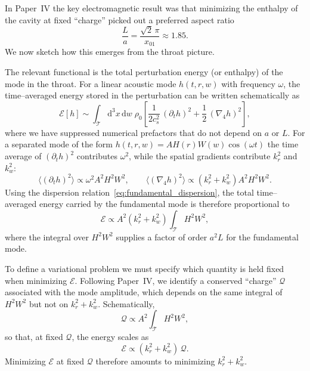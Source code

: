 \documentclass[12pt]{article}
\begin{document}
In Paper~IV the key electromagnetic result was that minimizing the enthalpy
of the cavity at fixed ``charge'' picked out a preferred aspect ratio
\begin{equation}
  \frac{L}{a} = \frac{\sqrt{2}\,\pi}{x_{01}} \approx 1.85.
  \label{eq:aspect_ratio_result}
\end{equation}
We now sketch how this emerges from the throat picture.

The relevant functional is the total perturbation energy (or enthalpy) of
the mode in the throat.  For a linear acoustic mode $h(t,r,w)$ with
frequency $\omega$, the time--averaged energy stored in the perturbation can
be written schematically as
\begin{equation}
  \mathcal{E}[h]
  \sim \int_{\mathcal{T}}\!\mathrm{d}^3x\,\mathrm{d}w\;
       \rho_0
       \left[
         \frac{1}{2c_s^2}\,(\partial_t h)^2
         + \frac{1}{2}\,(\nabla_4 h)^2
       \right],
  \label{eq:enthalpy_functional}
\end{equation}
where we have suppressed numerical prefactors that do not depend on $a$ or
$L$.  For a separated mode of the form
$h(t,r,w) = A H(r)W(w)\cos(\omega t)$ the time average of $(\partial_t h)^2$
contributes $\omega^2$, while the spatial gradients contribute $k_r^2$ and
$k_w^2$:
\begin{equation}
  \langle (\partial_t h)^2 \rangle
  \propto \omega^2 A^2 H^2 W^2,
  \qquad
  \langle (\nabla_4 h)^2 \rangle
  \propto (k_r^2 + k_w^2) A^2 H^2 W^2.
\end{equation}
Using the dispersion relation~\eqref{eq:fundamental_dispersion}, the total
time--averaged energy carried by the fundamental mode is therefore
proportional to
\begin{equation}
  \mathcal{E}
  \propto A^2 (k_r^2 + k_w^2) \int_{\mathcal{T}} H^2 W^2,
  \label{eq:energy_kw}
\end{equation}
where the integral over $H^2 W^2$ supplies a factor of order $a^2 L$ for the
fundamental mode.

To define a variational problem we must specify which quantity is held fixed
when minimizing $\mathcal{E}$.  Following Paper~IV, we identify a conserved
``charge'' $\mathcal{Q}$ associated with the mode amplitude, which depends
on the same integral of $H^2W^2$ but not on $k_r^2+k_w^2$.  Schematically,
\begin{equation}
  \mathcal{Q}
  \propto A^2 \int_{\mathcal{T}} H^2 W^2,
  \label{eq:charge_functional}
\end{equation}
so that, at fixed $\mathcal{Q}$, the energy scales as
\begin{equation}
  \mathcal{E}
  \propto (k_r^2 + k_w^2)\,\mathcal{Q}.
\end{equation}
Minimizing $\mathcal{E}$ at fixed $\mathcal{Q}$ therefore amounts to
minimizing $k_r^2 + k_w^2$.
\end{document}
